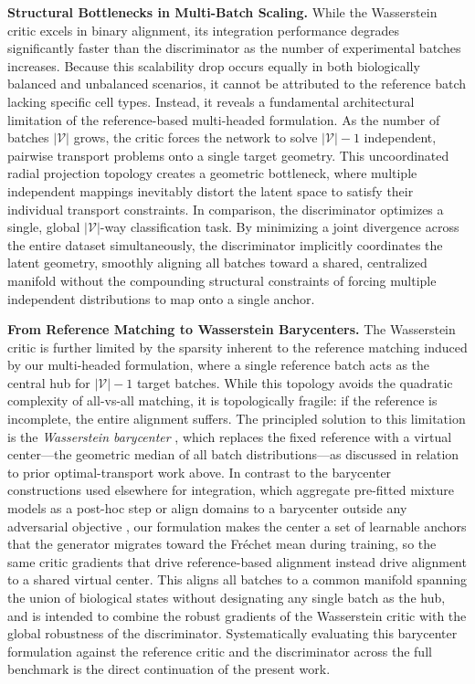 \documentclass[unnumsec,webpdf,contemporary,large]{oup-authoring-template}%
\theoremstyle{thmstyleone}%
\theoremstyle{thmstyletwo}%
\theoremstyle{thmstylethree}%
\begin{document}
\textbf{Structural Bottlenecks in Multi-Batch Scaling.} While the Wasserstein critic excels in binary alignment, its integration performance degrades significantly faster than the discriminator as the number of experimental batches increases. Because this scalability drop occurs equally in both biologically balanced and unbalanced scenarios, it cannot be attributed to the reference batch lacking specific cell types. Instead, it reveals a fundamental architectural limitation of the reference-based multi-headed formulation. As the number of batches $\lvert\mathcal{V}\rvert$ grows, the critic forces the network to solve $\lvert\mathcal{V}\rvert-1$ independent, pairwise transport problems onto a single target geometry. This uncoordinated radial projection topology creates a geometric bottleneck, where multiple independent mappings inevitably distort the latent space to satisfy their individual transport constraints. In comparison, the discriminator optimizes a single, global $\lvert\mathcal{V}\rvert$-way classification task. By minimizing a joint divergence across the entire dataset simultaneously, the discriminator implicitly coordinates the latent geometry, smoothly aligning all batches toward a shared, centralized manifold without the compounding structural constraints of forcing multiple independent distributions to map onto a single anchor.

\textbf{From Reference Matching to Wasserstein Barycenters.} The Wasserstein critic is further limited by the sparsity inherent to the reference matching induced by our multi-headed formulation, where a single reference batch acts as the central hub for $\lvert\mathcal{V}\rvert-1$ target batches. While this topology avoids the quadratic complexity of all-vs-all matching, it is topologically fragile: if the reference is incomplete, the entire alignment suffers. The principled solution to this limitation is the \textit{Wasserstein barycenter} \citep{doi:10.1137/100805741}, which replaces the fixed reference with a virtual center---the geometric median of all batch distributions---as discussed in relation to prior optimal-transport work above. In contrast to the barycenter constructions used elsewhere for integration, which aggregate pre-fitted mixture models as a post-hoc step \citep{Lin2023-maw} or align domains to a barycenter outside any adversarial objective \citep{Montesuma2021-wbt}, our formulation makes the center a set of learnable anchors that the generator migrates toward the Fr\'echet mean during training, so the same critic gradients that drive reference-based alignment instead drive alignment to a shared virtual center. This aligns all batches to a common manifold spanning the union of biological states without designating any single batch as the hub, and is intended to combine the robust gradients of the Wasserstein critic with the global robustness of the discriminator. Systematically evaluating this barycenter formulation against the reference critic and the discriminator across the full benchmark is the direct continuation of the present work.
\end{document}
